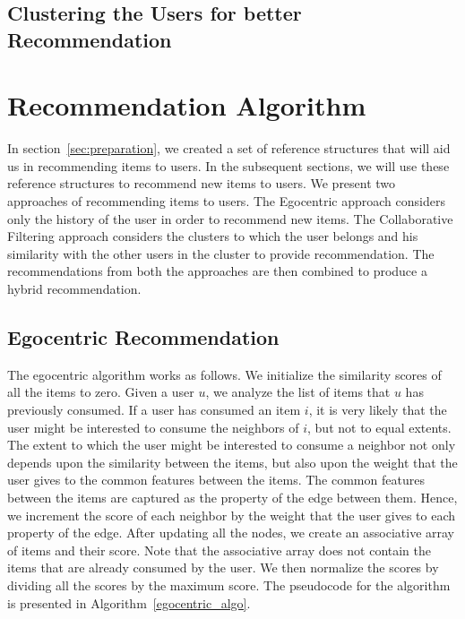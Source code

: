 \documentclass{acm_proc_article-sp}
\begin{document}
\subsection{Clustering the Users for better Recommendation}
\label{sec:clustering}

\section{Recommendation Algorithm}
In section~\ref{sec:preparation}, we created a set of reference structures that will aid us in recommending items to users. In the subsequent sections, we will use these reference structures to recommend new items to users. We present two approaches of recommending items to users. The Egocentric approach considers only the history of the user in order to recommend new items. The Collaborative Filtering approach considers the clusters to which the user belongs and his similarity with the other users in the cluster to provide recommendation. The recommendations from both the approaches are then combined to produce a hybrid recommendation.

\subsection{Egocentric Recommendation}
\label{sec:egocentric}

The egocentric algorithm works as follows. We initialize the similarity scores of all the items to zero. Given a user $u$, we analyze the list of items that $u$ has previously consumed. If a user has consumed an item $i$, it is very likely that the user might be interested to consume the neighbors of $i$, but not to equal extents. The extent to which the user might be interested to consume a neighbor not only depends upon the similarity between the items, but also upon the weight that the user gives to the common features between the items. The common features between the items are captured as the property of the edge between them. Hence, we increment the score of each neighbor by the weight that the user gives to each property of the edge. After updating all the nodes, we create an associative array of items and their score. Note that the associative array does not contain the items that are already consumed by the user. We then normalize the scores by dividing all the scores by the maximum score. The 
pseudocode for the algorithm is presented in Algorithm~\ref{egocentric_algo}.
\end{document}
